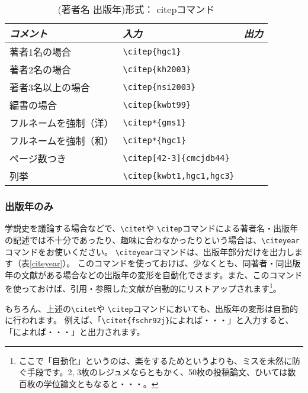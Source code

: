 \documentclass[article, 11pt]{jlreq}
\begin{document}
\begin{table}[htb]
\caption{ (著者名 出版年)形式： citepコマンド}
\label{citep}
\begin{center}
\begin{tabular}{lll} \hline
\emph{コメント} & \emph{入力} & \emph{出力} \\ \hline
著者1名の場合 & \verb|\citep{hgc1}| & \citep{hgc1} \\
著者2名の場合 & \verb|\citep{kh2003}| & \citep{kh2003} \\
著者3名以上の場合 & \verb|\citep{nsi2003}| & \citep{nsi2003} \\
編書の場合 & \verb|\citep{kwbt99}| & \citep{kwbt99} \\
フルネームを強制（洋） & \verb|\citep*{gms1}| & \citep*{gms1} \\
フルネームを強制（和） & \verb|\citep*{hgc1}| & \citep*{hgc1} \\
ページ数つき & \verb|\citep[42-3]{cmcjdb44}| & \citep[42-3]{cmcjdb44} \\
列挙 & \verb|\citep{kwbt1,hgc1,hgc3}| & \citep{kwbt1,hgc1,hgc3} \\
\hline
\end{tabular}
\end{center}
\end{table}

\nocite{kwbt99}

\subsubsection{出版年のみ}

学説史を議論する場合などで、\verb|\citet|や \verb|\citep|コマンドによる著者名・出版年の記述では不十分であったり、趣味に合わなかったりという場合は、\verb|\citeyear|コマンドをお使いください。
\verb|\citeyear|コマンドは、出版年部分だけを出力します（表\ref{citeyear}）。
このコマンドを使っておけば、少なくとも、同著者・同出版年の文献がある場合などの出版年の変形を自動化できます。また、このコマンドを使っておけば、引用・参照した文献が自動的にリストアップされます\footnote{ここで「自動化」というのは、楽をするためというよりも、ミスを未然に防ぐ手段です。2, 3枚のレジュメならともかく、50枚の投稿論文、ひいては数百枚の学位論文ともなると・・・。}。

もちろん、上述の\verb|\citet|や \verb|\citep|コマンドにおいても、出版年の変形は自動的に行われます。
例えば、「\verb|\citet{fschr92j}|によれば・・・」と入力すると、「\citet{fschr92j}によれば・・・」と出力されます。
\end{document}
